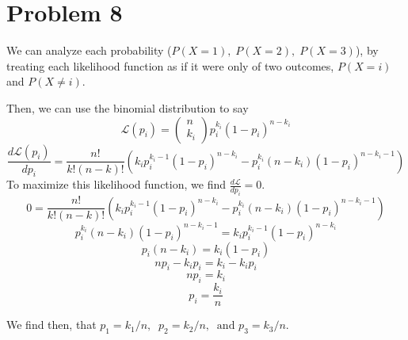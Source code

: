 \documentclass{report}
\begin{document}
\newpage
\section*{Problem 8}

We can analyze each probability ($P(X=1),\;P(X=2),\;P(X=3)$), by treating each likelihood function as if it were only of two outcomes, $P(X=i)$ and $P(X\neq i)$. 

Then, we can use the binomial distribution to say
$$ \mathscr{L}(p_i) = \begin{pmatrix} n\\k_i\end{pmatrix}p_i^{k_i}(1-p_i)^{n-k_i} $$ 
$$ \frac{d\mathscr{L}(p_i)}{dp_i} = \frac{n!}{k!(n-k)!}\left(k_i p_i^{k_i-1}(1-p_i)^{n-k_i} - p_i^{k_i}(n-k_i)(1-p_i)^{n-k_i-1}\right) $$ 
To maximize this likelihood function, we find $\frac{d\mathscr{L}}{dp_i} = 0$. 
$$ 0 = \frac{n!}{k!(n-k)!}\left(k_i p_i^{k_i-1}(1-p_i)^{n-k_i} - p_i^{k_i}(n-k_i)(1-p_i)^{n-k_i-1}\right) $$ 
$$ p_i^{k_i}(n-k_i)(1-p_i)^{n-k_i-1} = k_i p_i^{k_i-1}(1-p_i)^{n-k_i} $$ 
$$ p_i(n-k_i) = k_i (1-p_i) $$ 
$$ n p_i - k_i p_i = k_i - k_i p_i $$ 
$$ n p_i = k_i $$ 
$$ p_i = \frac{k_i}{n} $$ 

We find then, that $p_1 = k_1/n,\;\; p_2 = k_2/n,\;\; \text{and } p_3 = k_3/n$.
\end{document}
